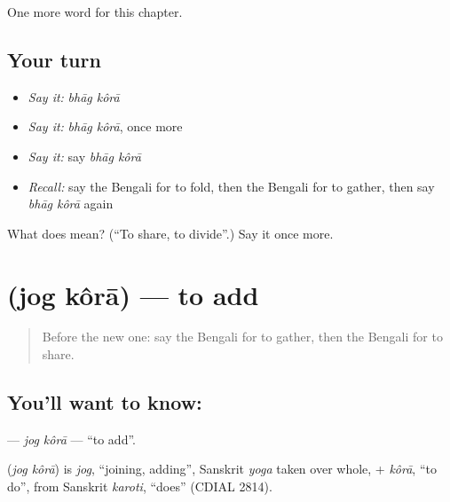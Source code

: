 \begin{grammarlens}[title={What you've built}]
One more word for this chapter.
\end{grammarlens}

\subsection*{Your turn}
\begin{itemize}
\raggedright
  \item \emph{Say it:} \emph{bhāg kôrā}
  \item \emph{Say it:} \emph{bhāg kôrā}, once more
  \item \emph{Say it:} say \emph{bhāg kôrā}
  \item \emph{Recall:} say the Bengali for to fold, then the Bengali for to gather, then say \emph{bhāg kôrā} again
\end{itemize}

\begin{tcolorbox}[breakable,colback=teal!4,colframe=teal!35!black,title={Before you move on}]
What does   mean? (\textquotedblleft{}To share, to divide\textquotedblright{}.) Say it once more.
\end{tcolorbox}
\section[\texorpdfstring{\bn{যোগ} \bn{করা} (jog kôrā)}{যোগ করা (jog kôrā)}]{  (jog kôrā) — to add}

\label{lesson:BN-C182-jog-kora}



\begin{quote}
Before the new one: say the Bengali for to gather, then the Bengali for to share.
\end{quote}

\subsection*{You'll want to know:  }
\textbf{ } — \emph{jog kôrā} — \textquotedblleft{}to add\textquotedblright{}.

\begin{cousinweb}
\textbf{ } (\emph{jog kôrā}) is \emph{jog}, \textquotedblleft{}joining, adding\textquotedblright{}, Sanskrit \emph{yoga} taken over whole, + \emph{kôrā}, \textquotedblleft{}to do\textquotedblright{}, from Sanskrit \emph{karoti}, \textquotedblleft{}does\textquotedblright{} (CDIAL 2814).
\end{cousinweb}

